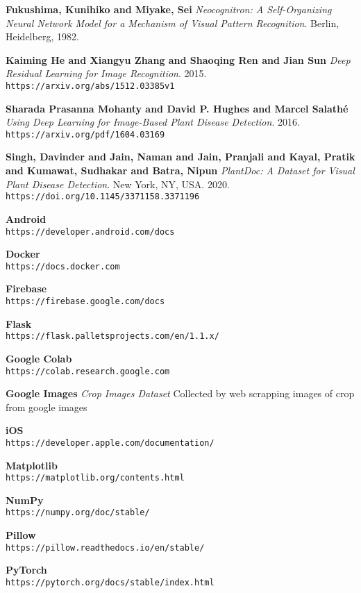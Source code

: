 \documentclass[../Report.tex]{subfiles}
\begin{document}
\begin{thebibliography}{9}
    \textbf{Fukushima, Kunihiko and Miyake, Sei}
    \textit{Neocognitron: A Self-Organizing Neural Network Model for a Mechanism of Visual Pattern Recognition}. 
    Berlin, Heidelberg, 1982.

    \textbf{Kaiming He and Xiangyu Zhang and Shaoqing Ren and Jian Sun}
    \textit{Deep Residual Learning for Image Recognition}. 2015.
    \\\texttt{https://arxiv.org/abs/1512.03385v1}
    
    \textbf{Sharada Prasanna Mohanty and David P. Hughes and Marcel Salath{\'{e}}}
    \textit{Using Deep Learning for Image-Based Plant Disease Detection}. 2016.
    \\\texttt{https://arxiv.org/pdf/1604.03169}

    \textbf{Singh, Davinder and Jain, Naman and Jain, Pranjali and Kayal, Pratik and Kumawat, Sudhakar and Batra, Nipun}
    \textit{PlantDoc: A Dataset for Visual Plant Disease Detection}.
    New York, NY, USA. 2020.
    \\\texttt{https://doi.org/10.1145/3371158.3371196}

    \textbf{Android}
    \\\texttt{https://developer.android.com/docs}

    \textbf{Docker}
    \\\texttt{https://docs.docker.com}

    \textbf{Firebase}
    \\\texttt{https://firebase.google.com/docs}

    \textbf{Flask}
    \\\texttt{https://flask.palletsprojects.com/en/1.1.x/}

    \textbf{Google Colab}
    \\\texttt{https://colab.research.google.com}

    \textbf{Google Images}
    \textit{Crop Images Dataset} Collected by web scrapping images of crop from google images

    \textbf{iOS}
    \\\texttt{https://developer.apple.com/documentation/}

    \textbf{Matplotlib}
    \\\texttt{https://matplotlib.org/contents.html}

    \textbf{NumPy}
    \\\texttt{https://numpy.org/doc/stable/}

    \textbf{Pillow}
    \\\texttt{https://pillow.readthedocs.io/en/stable/}

    \textbf{PyTorch}
    \\\texttt{https://pytorch.org/docs/stable/index.html}




\end{thebibliography}
\end{document}
